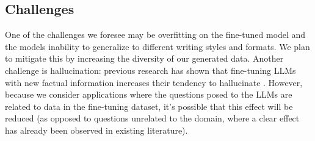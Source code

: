 \subsection{Challenges}

One of the challenges we foresee may be overfitting on the fine-tuned model and
the models inability to generalize to different writing styles and formats. We
plan to mitigate this by increasing the diversity of our generated data. Another
challenge is hallucination: previous research has shown that fine-tuning LLMs
with new factual information increases their tendency to hallucinate
\citep{gekhman_does_2024}. However, because we consider applications where the
questions posed to the LLMs are related to data in the fine-tuning dataset, it's
possible that this effect will be reduced (as opposed to questions unrelated to
the domain, where a clear effect has already been observed in existing
literature).
